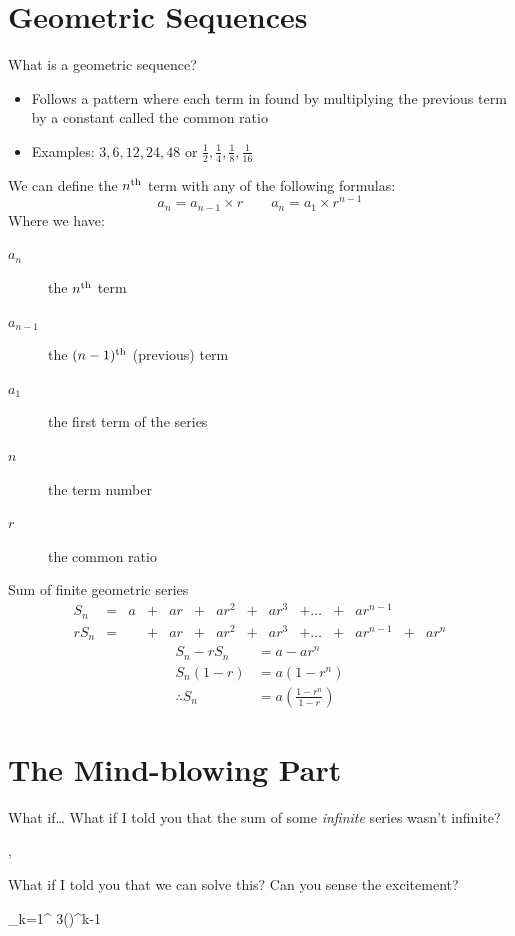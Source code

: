 	\section{Geometric Sequences}
	\begin{namedframe}{What is a geometric sequence?}
		\begin{itemize}
			\item Follows a pattern where each term in found by multiplying the previous term by a constant called the common ratio
			\item Examples: $3,6,12,24,48$ \hspace{2em} or \hspace{2em} $\frac{1}{2},\frac{1}{4},\frac{1}{8},\frac{1}{16}$
		\end{itemize}
		\pause
		We can define the $n\textsuperscript{th}$ term with any of the following formulas:
		\[a_n = a_{n-1} \times r \qquad a_n = a_1 \times r^{n-1}\]
		Where we have:
		\begin{description}
			\item[$a_n$] the $n\textsuperscript{th}$ term
			\item[$a_{n-1}$] the $(n-1)\textsuperscript{th}$ (previous) term
			\item[$a_1$] the first term of the series
			\item[$n$] the term number
			\item[$r$] the common ratio
		\end{description}
	\end{namedframe}
	\begin{namedframe}{Sum of finite geometric series}
		\begin{equation*}
			\begin{array}{lrrrrrrrrrrrrr}
				S_n  &= &a &+ &ar &+ &ar^2 &+ &ar^3 &+ \dots &+ &ar^{n-1} &  &    \\
				rS_n &= &  &+ &ar &+ &ar^2 &+ &ar^3 &+ \dots &+ &ar^{n-1} &+ &ar^n
			\end{array}
		\end{equation*}
		\begin{align*}
			S_n - rS_n &= a - ar^n\\
			S_n(1 - r) &= a(1-r^n)\\
			\therefore S_n &= a\left(\frac{1-r^n}{1-r}\right)
		\end{align*}
	\end{namedframe}
	\section{The Mind-blowing Part}
	\begin{namedframe}{What if\dots}
		What if I told you that the sum of some \emph{infinite} series wasn't infinite?

		\sep

		What if I told you that we can solve this? Can you sense the excitement?

		\begin{sizedmath}{\Huge}
			\sum_{k=1}^{\infty} 3\left(\right)^{k-1}
		\end{sizedmath}
	\end{namedframe}

